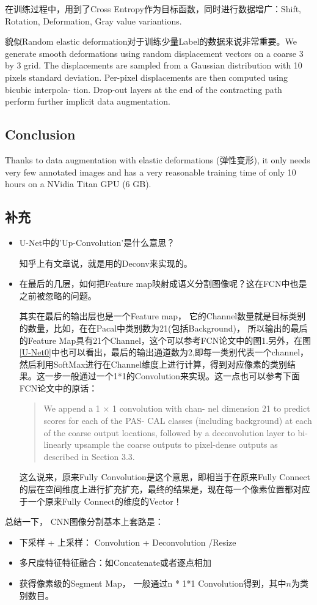 在训练过程中，用到了Cross Entropy作为目标函数，同时进行数据增广：Shift, Rotation, Deformation, Gray value variantions.

貌似Random elastic deformation对于训练少量Label的数据来说非常重要。We generate smooth
deformations using random displacement vectors on a coarse 3 by 3 grid. The
displacements are sampled from a Gaussian distribution with 10 pixels standard
deviation. Per-pixel displacements are then computed using bicubic interpola-
tion. Drop-out layers at the end of the contracting path perform further implicit
data augmentation.


\subsection{Conclusion}

Thanks to data augmentation with elastic deformations (弹性变形), it only needs very few annotated images and has a very reasonable training time of only 10 hours on a NVidia Titan GPU (6 GB).

\subsection{补充}
\begin{itemize}
\item U-Net中的'Up-Convolution'是什么意思？

知乎上有文章说，就是用的Deconv来实现的。

\item 在最后的几层，如何把Feature map映射成语义分割图像呢？这在FCN\cite{Fcn2014}中也是之前被忽略的问题。

其实在最后的输出层也是一个Feature map， 它的Channel数量就是目标类别的数量，比如，在在Pacal中类别数为21(包括Background)， 所以输出的最后的Feature Map具有21个Channel，这个可以参考FCN论文中的图1.另外，在图\ref{U-Net0}中也可以看出，最后的输出通道数为2,即每一类别代表一个channel，然后利用SoftMax进行在Channel维度上进行计算，得到对应像素的类别结果。这一步一般通过一个1*1的Convolution来实现。这一点也可以参考下面FCN论文中的原话：
\begin{quote}
	We append a 1 × 1 convolution with chan-
	nel dimension 21 to predict scores for each of the PAS-
	CAL classes (including background) at each of the coarse
	output locations, followed by a deconvolution layer to bi-
	linearly upsample the coarse outputs to pixel-dense outputs
	as described in Section 3.3.
\end{quote}

这么说来，原来Fully Convolution是这个意思，即相当于在原来Fully Connect的层在空间维度上进行扩充扩充，最终的结果是，现在每一个像素位置都对应于一个原来Fully Connect的维度的Vector！
\end{itemize}

总结一下， CNN图像分割基本上套路是：
\begin{itemize}
\item 下采样 + 上采样： Convolution + Deconvolution /Resize
\item 多尺度特征特征融合：如Concatenate或者逐点相加
\item 获得像素级的Segment Map， 一般通过n * 1*1 Convolution得到，其中$n$为类别数目。
\end{itemize}









